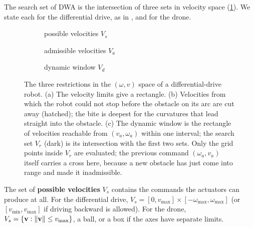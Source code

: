The search set of DWA is the intersection of three sets in velocity space
(\cref{fig:ch14-spaces}). We state each for the differential drive, as in
\cite{fox1997dwa}, and for the drone.

\begin{figure}[tb]
  \centering
  \begin{subfigure}[b]{0.32\textwidth}\centering
    \caption{possible velocities $V_s$}
  \end{subfigure}\hfill
  \begin{subfigure}[b]{0.32\textwidth}\centering
    \caption{admissible velocities $V_a$}
  \end{subfigure}\hfill
  \begin{subfigure}[b]{0.32\textwidth}\centering
    \caption{dynamic window $V_d$}
  \end{subfigure}
  \caption{The three restrictions in the $(\omega, v)$ space of a
  differential-drive robot. (a) The velocity limits give a rectangle.
  (b) Velocities from which the robot could not stop before the obstacle on
  its arc are cut away (hatched); the bite is deepest for the curvatures that
  lead straight into the obstacle. (c) The dynamic window is the rectangle of
  velocities reachable from $(v_a, \omega_a)$ within one interval; the search
  set $V_r$ (dark) is its intersection with the first two sets. Only the grid
  points inside $V_r$ are evaluated; the previous command $(\omega_a, v_a)$
  itself carries a cross here, because a new obstacle has just come into range
  and made it inadmissible.}
  \label{fig:ch14-spaces}
\end{figure}

\begin{definition}
\label{def:ch14-possible}
The set of \textbf{possible velocities} $V_s$
contains the commands the actuators can produce at all. For the differential
drive, $V_s = [0, v_{\max}] \times [-\omega_{\max}, \omega_{\max}]$ (or
$[v_{\min}, v_{\max}]$ if driving backward is allowed). For the drone,
$V_s = \left\{ \mathbf{v} : \left\lVert \mathbf{v} \right\rVert \le v_{\max} \right\}$, a ball, or a box if the axes
have separate limits.
\end{definition}

